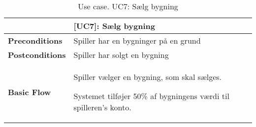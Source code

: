 \documentclass[class=article, crop=false]{standalone}
\begin{document}
    \begin{table}[H]
        \caption{Use case. UC7: Sælg bygning}
        \begin{tabularx}{\textwidth}{|l|X|}
            \hline
            & \textbf{[UC7]: Sælg bygning}   \\ \hline
            \textbf{Preconditions}       & Spiller har en bygninger på en grund\\ \hline
            \textbf{Postconditions}      & Spiller har solgt en bygning\\ \hline


            \textbf{Basic Flow} & \begin{tabenum}
                                      \item Spiller vælger en bygning, som skal sælges.
                                      \item Systemet tilføjer 50\% af bygningens værdi til spilleren's konto.
            \end{tabenum}   \\ \hline

        \end{tabularx}


    \end{table}
\end{document}
